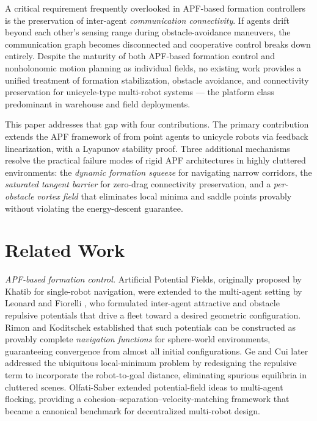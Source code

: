 \documentclass[letterpaper, 10 pt, journal, twoside]{IEEEtran}
\begin{document}
A critical requirement frequently overlooked in APF-based formation
controllers is the preservation of inter-agent \emph{communication
connectivity}.  If agents drift beyond each other's sensing range during
obstacle-avoidance maneuvers, the communication graph becomes disconnected
and cooperative control breaks down entirely.  Despite the maturity of both
APF-based formation control and nonholonomic motion planning as individual
fields, no existing work provides a unified treatment of formation
stabilization, obstacle avoidance, and connectivity preservation for
unicycle-type multi-robot systems — the platform class predominant in
warehouse and field deployments.

This paper addresses that gap with four contributions.  The primary
contribution extends the APF framework of \cite{kan2012ITAC} from point
agents to unicycle robots via feedback linearization, with a Lyapunov
stability proof.  Three additional mechanisms resolve the practical failure
modes of rigid APF architectures in highly cluttered environments: the
\emph{dynamic formation squeeze} for navigating narrow corridors, the
\emph{saturated tangent barrier} for zero-drag connectivity preservation,
and a \emph{per-obstacle vortex field} that eliminates local minima and
saddle points provably without violating the energy-descent guarantee.


\section{Related Work}

\textit{APF-based formation control.}
Artificial Potential Fields, originally proposed by Khatib
\cite{khatib1986IJRR} for single-robot navigation, were extended to the
multi-agent setting by Leonard and Fiorelli \cite{leonard2001P4ICDCCN}, who
formulated inter-agent attractive and obstacle repulsive potentials that drive
a fleet toward a desired geometric configuration.  Rimon and Koditschek
\cite{rimon1992TRA} established that such potentials can be constructed as
provably complete \emph{navigation functions} for sphere-world environments,
guaranteeing convergence from almost all initial configurations.  Ge and Cui
\cite{ge2000TRA} later addressed the ubiquitous local-minimum problem by
redesigning the repulsive term to incorporate the robot-to-goal distance,
eliminating spurious equilibria in cluttered scenes.  Olfati-Saber
\cite{olfatisaber2006TAC} extended potential-field ideas to multi-agent
flocking, providing a cohesion--separation--velocity-matching framework
that became a canonical benchmark for decentralized multi-robot design.
\end{document}

